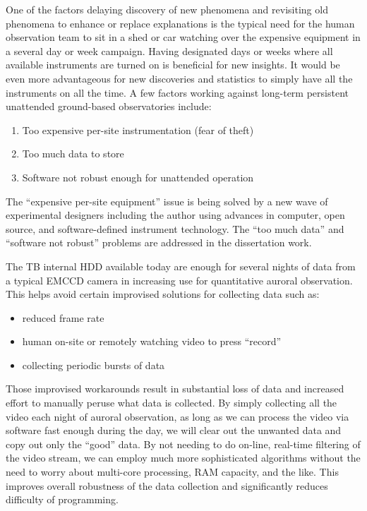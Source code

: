 One of the factors delaying discovery of new phenomena and revisiting old phenomena to enhance or replace explanations is the typical need for the human observation team to sit in a shed or car watching over the expensive equipment in a several day or week campaign.
Having designated days or weeks where all available instruments are turned on is beneficial for new insights.
It would be even more advantageous for new discoveries and statistics to simply have all the instruments on all the time.
A few factors working against long-term persistent unattended ground-based observatories include:
\begin{enumerate}
    \item Too expensive per-site instrumentation (fear of theft)
    \item Too much data to store
    \item Software not robust enough for unattended operation
\end{enumerate}
The ``expensive per-site equipment'' issue is being solved by a new wave of experimental designers including the author using advances in computer, open source, and software-defined instrument technology.
The ``too much data'' and ``software not robust'' problems are addressed in the dissertation work.

The \unit[10]{TB} internal HDD available today are enough for several nights of data from a typical EMCCD camera in increasing use for quantitative auroral observation.
This helps avoid certain improvised solutions for collecting data such as:
\begin{itemize}
    \item reduced frame rate
    \item human on-site or remotely watching video to press ``record''
    \item collecting periodic bursts of data
\end{itemize}
Those improvised workarounds result in substantial loss of data and increased effort to manually peruse what data is collected.
By simply collecting all the video each night of auroral observation, as long as we can process the video via software fast enough during the day, we will clear out the unwanted data and copy out only the ``good'' data.
By not needing to do on-line, real-time filtering of the video stream, we can employ much more sophisticated algorithms without the need to worry about multi-core processing, RAM capacity, and the like.
This improves overall robustness of the data collection and significantly reduces difficulty of programming.


